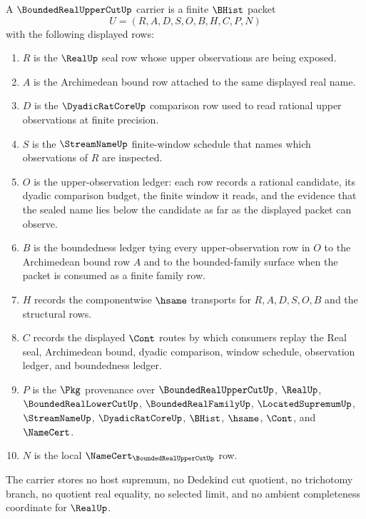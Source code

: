 \begin{definition}
\label{def:bounded-real-upper-cut-carrier}
A $\BoundedRealUpperCutUp$ carrier is a finite $\BHist$ packet
$$
U=(R,A,D,S,O,B,H,C,P,N)
$$
with the following displayed rows:
\begin{enumerate}
\item $R$ is the $\RealUp$ seal row whose upper observations are being exposed.
\item $A$ is the Archimedean bound row attached to the same displayed real name.
\item $D$ is the $\DyadicRatCoreUp$ comparison row used to read rational upper observations at finite precision.
\item $S$ is the $\StreamNameUp$ finite-window schedule that names which observations of $R$ are inspected.
\item $O$ is the upper-observation ledger: each row records a rational candidate, its dyadic comparison budget, the finite window it reads, and the evidence that the sealed name lies below the candidate as far as the displayed packet can observe.
\item $B$ is the boundedness ledger tying every upper-observation row in $O$ to the Archimedean bound row $A$ and to the bounded-family surface when the packet is consumed as a finite family row.
\item $H$ records the componentwise $\hsame$ transports for $R,A,D,S,O,B$ and the structural rows.
\item $C$ records the displayed $\Cont$ routes by which consumers replay the Real seal, Archimedean bound, dyadic comparison, window schedule, observation ledger, and boundedness ledger.
\item $P$ is the $\Pkg$ provenance over $\BoundedRealUpperCutUp$, $\RealUp$, $\BoundedRealLowerCutUp$, $\BoundedRealFamilyUp$, $\LocatedSupremumUp$, $\StreamNameUp$, $\DyadicRatCoreUp$, $\BHist$, $\hsame$, $\Cont$, and $\NameCert$.
\item $N$ is the local $\NameCert_{\BoundedRealUpperCutUp}$ row.
\end{enumerate}
The carrier stores no host supremum, no Dedekind cut quotient, no trichotomy branch, no quotient real equality, no selected limit, and no ambient completeness coordinate for $\RealUp$.
\end{definition}

